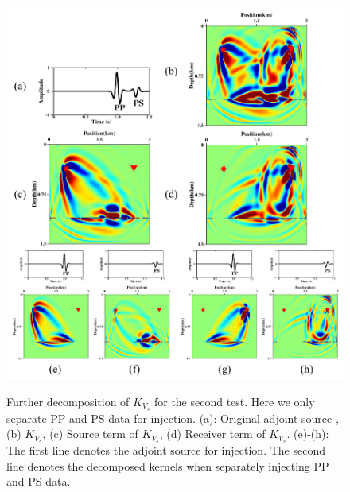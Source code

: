 \begin{figure}[!htb]
   \centering
   {\includegraphics[width=1.0\textwidth]{Kernel/Combinations/K_vs1.pdf}}
   \caption{
   Further decomposition of $K_{V_s}$ for the second test. Here we only separate PP and PS data
   for injection. (a): Original adjoint source
   , (b) $K_{V_s}$, (c) Source term of $K_{V_s}$, (d)
   Receiver term of $K_{V_s}$. (e)-(h): The first line denotes the adjoint source for
   injection. The second line denotes the decomposed kernels when separately
   injecting PP and PS data. 
   }
   \label{fig:kernel_vs_decomp}
\end{figure}
\clearpage
